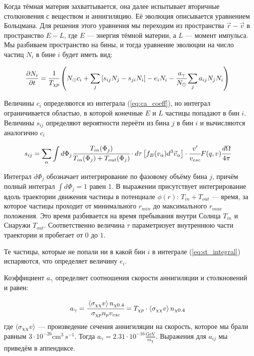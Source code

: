 Когда тёмная материя захваттывается, она далее испытывает вторичные столкновения с веществом и аннигиляцию. Её эволюция описывается уравнением Больцмана. Для решения этого уравнения мы переходим из пространства $\vec{r}-\vec{v}$ в пространство $E-L$, где $E$ --- энергия тёмной материи, а $L$ --- момент импульса. Мы разбиваем пространство на бины, и тогда уравнение эволюции на число частиц $N_{i}$ в бине $i$ будет иметь вид:

\begin{equation}
	\label{eq:evolution}
	\frac{\partial N_{i}}{\partial t} = \cfrac{1}{T_{\chi p}} \left(N_{\odot} c_i +
	\sum_j{[s_{ij} N_{j} - s_{ji} N_{i} ]} - e_{i} N_i - \cfrac{a_{\gamma}}{N_{\odot}} \sum_j {a_{ij} N_j N_i} \right)
\end{equation}

Величины $c_i$ определяются из интеграла (\ref{eq:ca_coeff}), но интеграл ограничивается областью, в которой конечные $E$ и $L$ частицы попадают в бин $i$.
Величины $s_{ij}$ определяют вероятности переёти из бина $j$ в бин $i$ и вычисляются аналогично $c_{i}$

\begin{equation}
	\label{eq:st_integral}
	s_{ij} = \sum_{\alpha}\int{
		d\Phi_{j}
		\cfrac{T_{in}(\Phi_{j})}{
			T_{in}(\Phi_{j})+T_{out}(\Phi_{j})
		} \cdot d\tau \left[ f_B(v_{\alpha}) d^3 \vec{v}_{\alpha} \right] \cdot \cfrac{v'}{v_{esc}} F(q,v) \cfrac{d\Omega}{4\pi}
	}
\end{equation}

\noindent Интеграл $d\Phi_{j}$ обозначает интегрирование по фазовому объёму бина $j$, причём полный интеграл $\int{d\Phi_{j}} = 1$ равен $1$. В выражении присутствует интегрирование вдоль траектории движения частицы в потенциале $\phi(r)$: $T_{in} + T_{out}$ --- время, за которое частицы проходит от минимального $r_{min}$ до максимального $r_{max}$ положения. Это время разбивается на время пребывания внутри Солнца $T_{in}$ и Снаружи $T_{out}$. Соответственно величина $\tau$ параметризует внутреннюю части траектории и пробегает от $0$ до $1$.

Те частицы, которые не попали ни в какой бин $i$ в интеграле (\ref{eq:st_integral}) испаряются, что определяет величину $e_i$.

Коэффициент $a_{\gamma}$ определяет соотношения скорости аннигиляции и столкновений и равен:

\begin{equation}
	a_{\gamma} = \cfrac{ \left\langle \sigma_{\chi\chi} v \right\rangle n_{\chi 0.4}}{\sigma_{\chi p} n_{p} v_{esc}} = 
	T_{\chi p} \cdot \left\langle \sigma_{\chi\chi} v \right\rangle n_{\chi 0.4}
\end{equation}
где $\left\langle \sigma_{\chi\chi} v \right\rangle$ --- произведение сечения аннигиляции на скорость, которое мы брали равным $3\cdot10^{-26}\text{cm}^3\,{s^{-1}}$. Тогда $a_{\gamma} = 2.31\cdot10^{-16} \frac{\text{GeV}}{m_{\chi}}$. Выражения для $a_{ij}$ мы приведём в аппендиксе.

